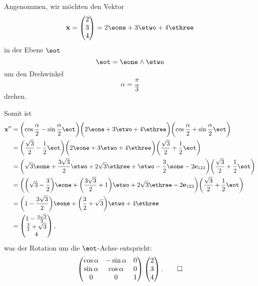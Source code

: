\begin{beispiel}
Angenommen, wir möchten den Vektor
  \begin{equation*}
    \mathbf{x} = \begin{pmatrix} 2 \\ 3 \\ 4\end{pmatrix} = 2 \eone + 3 \etwo + 4 \ethree
  \end{equation*}
in der Ebene $\eot$
  \begin{equation*}
    \eot = \eone \wedge \etwo
  \end{equation*}
um den Drehwinkel
\begin{equation*}
  \alpha = \frac{\pi}{3}
\end{equation*}
drehen.

Somit ist
  \bgroup
    \newcommand{\fraca}{\frac{\sqrt{3}}{2}}
    \newcommand{\fracb}{\frac{1}{2}}
    \begin{align*}
    \mathbf{x}'' &= \biggl( \cos{\frac{\alpha}{2}} - \sin{\frac{\alpha}{2}} \eot \biggr) \biggl(2 \eone + 3 \etwo + 4 \ethree\biggr) \biggl(\cos{\frac{\alpha}{2}} + \sin{\frac{\alpha}{2}} \eot\biggr) \\
      &= \biggl(\fraca - \fracb \eot \biggr) \biggl(2\eone + 3 \etwo + 4 \ethree\biggr) \biggl(\fraca + \fracb \eot \biggr) \\
      &= \biggl(\sqrt{3} \eone + \frac{3\sqrt{3}}{2} \etwo + 2\sqrt{3}\ethree + \etwo - \frac{3}{2}\eone - 2 \mathbf{e}_{123}\biggr) \biggl(\fraca + \fracb \eot\biggr) \\
      &= \biggl( \biggl( \sqrt{3} - \frac{3}{2} \biggr) \eone + \biggl(\frac{3\sqrt{3}}{2} + 1\biggr)\etwo + 2 \sqrt{3} \ethree - 2 \mathbf{e}_{123} \biggr) \biggl(\fraca + \fracb \eot\biggr) \\
      &= \biggl(1 - \frac{3 \sqrt{3}}{2}\biggr) \eone + \biggl(\frac{3}{2} + \sqrt{3}\biggr) \etwo + 4 \ethree \\
      &= \begin{pmatrix} 1 - \frac{3 \sqrt{3}}{2} \\ \frac{3}{2} + \sqrt{3} \\ 4 \end{pmatrix},
    \end{align*}
  \egroup
  was der Rotation um die $\eot$-Achse entspricht:
  \begin{equation*}
    \begin{pmatrix}
      \cos{\alpha} & -\sin{\alpha} & 0 \\
      \sin{\alpha} & \cos{\alpha} & 0 \\
      0 & 0 & 1
    \end{pmatrix} \begin{pmatrix} 2 \\ 3 \\ 4 \end{pmatrix}. \qedhere
  \end{equation*}
\end{beispiel}
